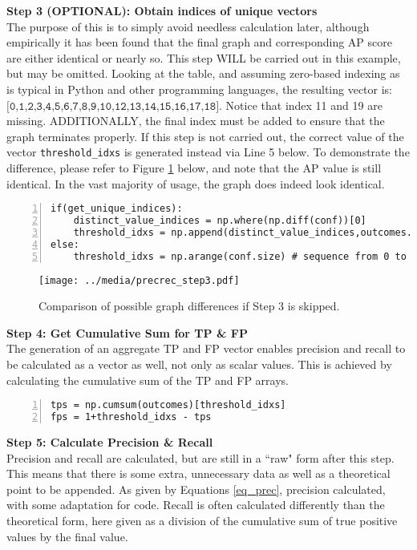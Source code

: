 \textbf{{\large Step 3 (OPTIONAL): Obtain indices of unique vectors}} \\
The purpose of this is to simply avoid needless calculation later, although empirically it has been found that the final graph and corresponding AP score are either identical or nearly so. This step WILL be carried out in this example, but may be omitted. Looking at the table, and assuming zero-based indexing as is typical in Python and other programming languages, the resulting vector is: $\texttt{[0,1,2,3,4,5,6,7,8,9,10,12,13,14,15,16,17,18]}$. Notice that index 11 and 19 are missing. ADDITIONALLY, the final index must be added to ensure that the graph terminates properly. If this step is not carried out, the correct value of the vector \texttt{threshold\_idxs} is generated instead via Line 5 below. To demonstrate the difference, please refer to Figure \ref{precrec_step3} below, and note that the AP value is still identical. In the vast majority of usage, the graph does indeed look identical.
\begin{lstlisting}[numbers=left]
if(get_unique_indices):
    distinct_value_indices = np.where(np.diff(conf))[0]
    threshold_idxs = np.append(distinct_value_indices,outcomes.size-1)
else:
    threshold_idxs = np.arange(conf.size) # sequence from 0 to N-1
\end{lstlisting}

\begin{figure}[H]
    \centering
    \texttt{[image: ../media/precrec\_step3.pdf]}
    \caption{Comparison of possible graph differences if Step 3 is skipped.}
    \label{precrec_step3}
\end{figure}


\textbf{{\large Step 4: Get Cumulative Sum for TP \& FP }} \\
The generation of an aggregate TP and FP vector enables precision and recall to be calculated as a vector as well, not only as scalar values. This is achieved by calculating the cumulative sum of the TP and FP arrays.
\begin{lstlisting}[numbers=left]
tps = np.cumsum(outcomes)[threshold_idxs]
fps = 1+threshold_idxs - tps
\end{lstlisting}


\textbf{{\large Step 5: Calculate Precision \& Recall}} \\
Precision and recall are calculated, but are still in a ``raw" form after this step. This means that there is some extra, unnecessary data as well as a theoretical point to be appended. As given by Equations \ref{eq_prec}, precision calculated, with some adaptation for code. Recall is often calculated differently than the theoretical form, here given as a division of the cumulative sum of true positive values by the final value.

